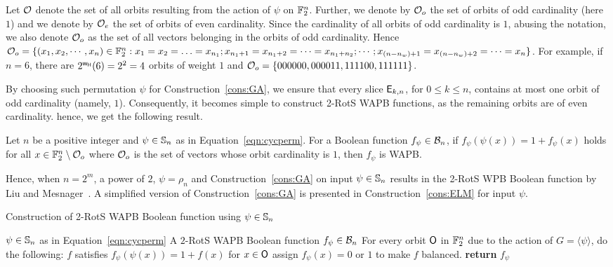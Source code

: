 \documentclass{llncs}
\begin{document}
\fi
Let $\mathcal{O}$ denote the set of all orbits resulting from the action of $\psi$ on $\mathbb{F}_2^n$. 
Further, we denote by $\mathcal{O}_o$ the set of orbits of odd cardinality (\ie here $1$) and we denote by $\mathcal{O}_e$ the set of orbits of even cardinality. 
Since the cardinality of all orbits of odd cardinality is $1$, abusing the notation, we also denote $\mathcal{O}_o$ as the set of all vectors belonging in the orbits of odd cardinality. Hence %
$\mathcal{O}_o = \{(x_1, x_2, \cdots, x_n) \in \mathbb{F}_2^n : x_1 = x_2 = \ldots = x_{n_1}; x_{n_1 + 1} = x_{n_1 + 2} = \cdots = x_{n_1 + n_2}; \cdots ; x_{(n- n_w ) + 1}  = x_{(n- n_w ) + 2} = \cdots = x_n\}$.
For example, if $n = 6$, there are $2^{\mathsf{w_H}}(6) = 2^2 = 4$ orbits of weight $1$ and $\mathcal{O}_o = \{000000, 000011, 111100, 111111\}$. 

By choosing such permutation $\psi$ for Construction~\ref{cons:GA}, we ensure that every slice $\mathsf{E}_{k,n}$, for $0 \leq k \leq n$, contains at most one orbit of odd cardinality (namely, $1$). 
Consequently, it becomes simple to construct 2-RotS WAPB functions, as the remaining orbits are of even cardinality. 
hence, we get the following result.

\begin{proposition}\label{prop:WAPB}
Let $n$ be a positive integer and $\psi \in \mathbb{S}_n$ as in Equation~\ref{eqn:cycperm}.
For a Boolean function $f_\psi \in \mathcal{B}_n$, if $f_\psi(\psi(x)) = 1+f_\psi(x)$ holds for all $x \in \mathbb{F}_2^n \setminus \mathcal{O}_o$ where $\mathcal{O}_o$ is the set of vectors whose orbit cardinality is $1$, then $f_\psi$ is WAPB.
\end{proposition}
Hence, when $n = 2^m$, a power of $2$, $\psi = \rho_n$ and Construction~\ref{cons:GA} on input $\psi \in \mathbb{S}_n$ results in the 2-RotS WPB Boolean function by Liu and Mesnager~\cite{DCC:LiuMes19}. A simplified version of Construction~\ref{cons:GA} is presented in Construction~\ref{cons:ELM} for input $\psi$.

\begin{constr} 
	\scriptsize
\caption{Construction of 2-RotS WAPB Boolean function using $\psi \in \mathbb{S}_n$ \label{cons:ELM}}
\begin{algorithmic}
\Require $\psi \in \mathbb{S}_n$ as in Equation~\ref{eqn:cycperm}
\Ensure A $2$-RotS WAPB Boolean function $f_\psi \in \mathcal{B}_n$
\State For every orbit $\mathsf{O}$ in $\mathbb{F}_2^n$ due to the action of $G = \langle \psi \rangle$, do the following:
	\State $f$ satisfies $f_\psi(\psi(x)) = 1+f(x)$ for $x \in \mathsf{O}$
\EndIf
{}
	\State assign $f_\psi(x) = 0$ or $1$ to make $f$ balanced.
\EndIf
\State \textbf{return} $f_\psi$
\end{algorithmic}
\end{constr}
\end{document}
